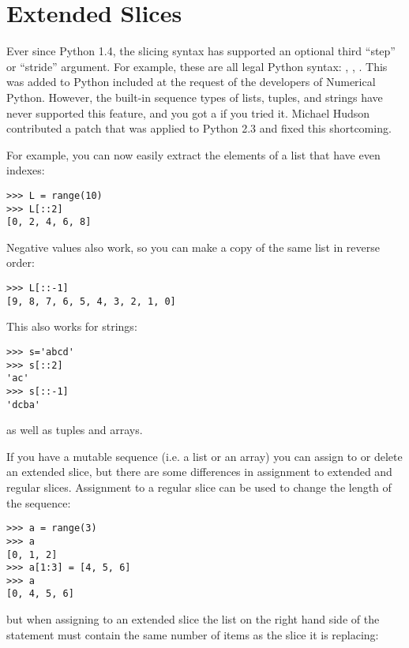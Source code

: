 \documentclass{howto}
\begin{document}
\section{Extended Slices\label{section-slices}}

Ever since Python 1.4, the slicing syntax has supported an optional
third ``step'' or ``stride'' argument.  For example, these are all
legal Python syntax: , ,
.  This was added to Python included at the request of
the developers of Numerical Python.  However, the built-in sequence
types of lists, tuples, and strings have never supported this feature,
and you got a  if you tried it.  Michael Hudson
contributed a patch that was applied to Python 2.3 and fixed this
shortcoming.

For example, you can now easily extract the elements of a list that
have even indexes:

\begin{verbatim}
>>> L = range(10)
>>> L[::2]
[0, 2, 4, 6, 8]
\end{verbatim}

Negative values also work, so you can make a copy of the same list in
reverse order:

\begin{verbatim}
>>> L[::-1]
[9, 8, 7, 6, 5, 4, 3, 2, 1, 0]
\end{verbatim}

This also works for strings:

\begin{verbatim}
>>> s='abcd'
>>> s[::2]
'ac'
>>> s[::-1]
'dcba'
\end{verbatim}

as well as tuples and arrays.

If you have a mutable sequence (i.e. a list or an array) you can
assign to or delete an extended slice, but there are some differences
in assignment to extended and regular slices.  Assignment to a regular
slice can be used to change the length of the sequence:

\begin{verbatim}
>>> a = range(3)
>>> a
[0, 1, 2]
>>> a[1:3] = [4, 5, 6]
>>> a
[0, 4, 5, 6]
\end{verbatim}

but when assigning to an extended slice the list on the right hand
side of the statement must contain the same number of items as the
slice it is replacing:
\end{document}
